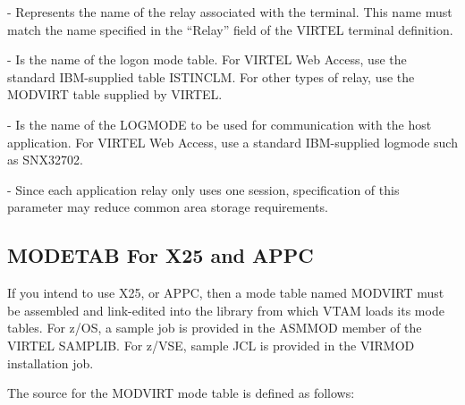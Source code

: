 \documentclass[letterpaper,10pt,english]{sphinxmanual}
\begin{document}
\begin{sphinxVerbatim}[commandchars=\\\{\}]
  
\end{sphinxVerbatim}

 - Represents the name of the relay associated with the terminal. This name must match the name specified in the “Relay” field of the VIRTEL terminal definition.

 - Is the name of the logon mode table. For VIRTEL Web Access, use the standard IBM-supplied table ISTINCLM. For other types of relay, use the MODVIRT table supplied by VIRTEL.

 - Is the name of the LOGMODE to be used for communication with the host application. For VIRTEL Web Access, use a standard IBM-supplied logmode such as SNX32702.

 - Since each application relay only uses one session, specification of this parameter may reduce common area storage requirements.

\ignorespaces 

\subsection{MODETAB For X25 and APPC}
\label{\detokenize{Installation_Guide:modetab-for-x25-and-appc}}\label{\detokenize{Installation_Guide:index-23}}
If you intend to use X25, or APPC, then a mode table named MODVIRT must be assembled and link-edited into the library from which VTAM loads its mode tables. For z/OS, a sample job is provided     in the ASMMOD member of the VIRTEL SAMPLIB. For z/VSE, sample JCL is provided in the VIRMOD installation job.

The source for the MODVIRT mode table is defined as follows:
\end{document}
